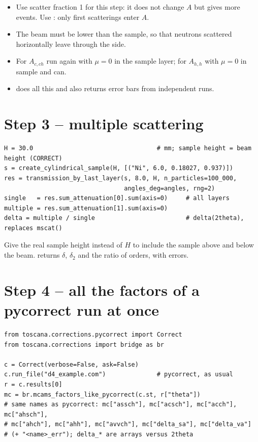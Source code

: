 \documentclass[11pt,a4paper]{report}
\begin{document}
\begin{itemize}
  \item Use scatter fraction 1 for this step: it does not change $A$ but gives
        more events. Use : only first scatterings enter $A$.
  \item The beam must be lower than the sample, so that neutrons scattered
        horizontally leave through the side.
  \item For $A_{c,ch}$ run again with $\mu=0$ in the sample layer; for $A_{h,h}$
        with $\mu=0$ in sample and can.
  \item {} does all
        this and also returns error bars from independent runs.
\end{itemize}

\section{Step 3 -- multiple scattering}

\begin{lstlisting}
H = 30.0                                  # mm; sample height = beam height (CORRECT)
s = create_cylindrical_sample(H, [("Ni", 6.0, 0.18027, 0.937)])
res = transmission_by_last_layer(s, 8.0, H, n_particles=100_000,
                                 angles_deg=angles, rng=2)
single   = res.sum_attenuation[0].sum(axis=0)     # all layers
multiple = res.sum_attenuation[1].sum(axis=0)
delta = multiple / single                         # delta(2theta), replaces mscat()
\end{lstlisting}
Give the real sample height instead of $H$ to include the sample above and below
the beam.  returns $\delta$, $\delta_2$ and the ratio of
orders, with errors.

\section{Step 4 -- all the factors of a pycorrect run at once}

\begin{lstlisting}
from toscana.corrections.pycorrect import Correct
from toscana.corrections import bridge as br

c = Correct(verbose=False, ask=False)
c.run_file("d4_example.com")              # pycorrect, as usual
r = c.results[0]
mc = br.mcams_factors_like_pycorrect(c.st, r["theta"])
# same names as pycorrect: mc["assch"], mc["acsch"], mc["acch"], mc["ahsch"],
# mc["ahch"], mc["ahh"], mc["avvch"], mc["delta_sa"], mc["delta_va"]
# (+ "<name>_err"); delta_* are arrays versus 2theta
\end{lstlisting}
\end{document}
